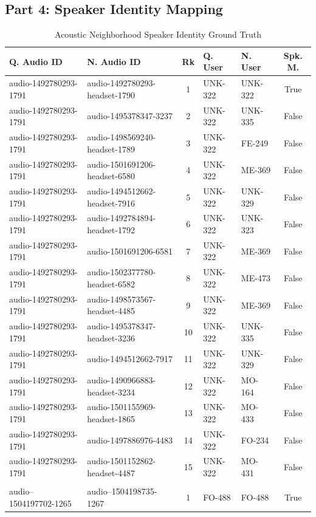 \subsection*{Part 4: Speaker Identity Mapping}
{\small
\begin{longtable}{ll c ll c}
\caption{Acoustic Neighborhood Speaker Identity Ground Truth} \\
\toprule
\textbf{Q. Audio ID} & \textbf{N. Audio ID} & \textbf{Rk} & \textbf{Q. User} & \textbf{N. User} & \textbf{Spk. M.} \\
\midrule
audio-1492780293-1791 & audio-1492780293-headset-1790 & 1 & UNK-322 & UNK-322 & True \\
audio-1492780293-1791 & audio-1495378347-3237 & 2 & UNK-322 & UNK-335 & False \\
audio-1492780293-1791 & audio-1498569240-headset-1789 & 3 & UNK-322 & FE-249 & False \\
audio-1492780293-1791 & audio-1501691206-headset-6580 & 4 & UNK-322 & ME-369 & False \\
audio-1492780293-1791 & audio-1494512662-headset-7916 & 5 & UNK-322 & UNK-329 & False \\
audio-1492780293-1791 & audio-1492784894-headset-1792 & 6 & UNK-322 & UNK-323 & False \\
audio-1492780293-1791 & audio-1501691206-6581 & 7 & UNK-322 & ME-369 & False \\
audio-1492780293-1791 & audio-1502377780-headset-6582 & 8 & UNK-322 & ME-473 & False \\
audio-1492780293-1791 & audio-1498573567-headset-4485 & 9 & UNK-322 & ME-369 & False \\
audio-1492780293-1791 & audio-1495378347-headset-3236 & 10 & UNK-322 & UNK-335 & False \\
audio-1492780293-1791 & audio-1494512662-7917 & 11 & UNK-322 & UNK-329 & False \\
audio-1492780293-1791 & audio-1490966883-headset-3234 & 12 & UNK-322 & MO-164 & False \\
audio-1492780293-1791 & audio-1501155969-headset-1865 & 13 & UNK-322 & MO-433 & False \\
audio-1492780293-1791 & audio-1497886976-4483 & 14 & UNK-322 & FO-234 & False \\
audio-1492780293-1791 & audio-1501152862-headset-4487 & 15 & UNK-322 & MO-431 & False \\
\midrule
 &  &  &  &  & \\ %
\midrule
audio--1504197702-1265 & audio--1504198735-1267 & 1 & FO-488 & FO-488 & True \\

\end{longtable}}
